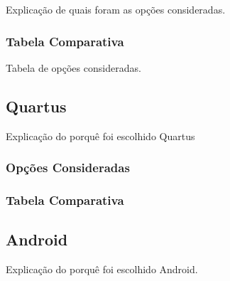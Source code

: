 	Explicação de quais foram as opções consideradas.
	
	\subsubsection{Tabela Comparativa}\label{vhdl-table}
	
	Tabela de opções consideradas.
	
	\subsection{Quartus}\label{soft-quartus}
	
	Explicação do porquê foi escolhido Quartus
	
	\subsubsection{Opções Consideradas}\label{quartus-options}

	
	\subsubsection{Tabela Comparativa}\label{quartus-table}
	
	
	\subsection{Android}\label{soft-android}
	
	Explicação do porquê foi escolhido Android.
